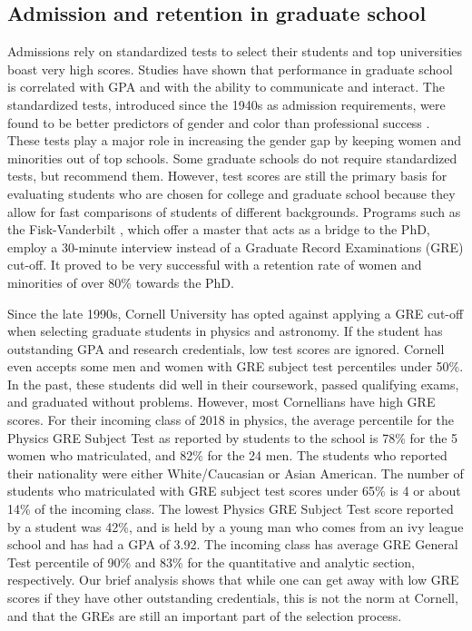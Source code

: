 \documentclass[utf8]{frontiersSCNS} %
\begin{document}
\subsection{Admission and retention in graduate school}
\label{6.2}
Admissions rely on standardized tests to select their students and top universities boast very high scores. Studies have shown that performance in graduate school is correlated with GPA and with the ability to communicate and interact. The standardized tests, introduced since the 1940s as admission requirements, were found to be better predictors of gender and color than professional success \citep{ripin1996fighting,miller2014test}. These tests play a major role in increasing the gender gap by keeping women and minorities out of top schools. Some graduate schools do not require standardized tests, but recommend them. However, test scores are still the primary basis for evaluating students who are chosen for college and graduate school because they allow for fast comparisons of students of different backgrounds. Programs such as the Fisk-Vanderbilt \citep{miller2014test}, which offer a master that acts as a bridge to the PhD, employ a 30-minute interview instead of a Graduate Record Examinations (GRE) cut-off. It proved to be very successful with a  retention rate of women and minorities of over 80\% towards the PhD. 

Since the late 1990s, Cornell University has opted against applying a GRE cut-off when selecting graduate students in physics and astronomy. If the student has outstanding GPA and research credentials, low test scores are ignored.  Cornell even accepts some men and women with GRE subject test percentiles under 50\%.  In the past, these students did well in their coursework, passed qualifying exams, and graduated without problems. However, most Cornellians have high GRE scores. For their incoming class of 2018 in physics, the average percentile for the Physics GRE Subject Test as reported by students to the school is 78\% for the 5 women who matriculated, and 82\% for the 24 men. The students who reported their nationality were either White/Caucasian or Asian American. The number of students who matriculated with GRE subject test scores under 65\% is 4 or about 14\% of the incoming class. The lowest Physics GRE Subject Test score reported by a student was 42\%, and is held by a young man who comes from an ivy league school and has had a GPA of 3.92. The incoming class has average GRE General Test percentile of 90\% and 83\% for the quantitative and analytic section, respectively. Our brief analysis shows that while one can get away with low GRE scores if they have other outstanding credentials, this is not the norm at Cornell, and that the GREs are still an important part of the selection process.
\end{document}
